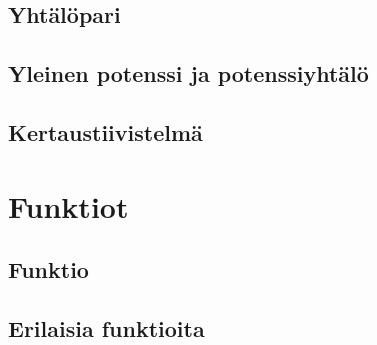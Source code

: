 \chapter{Yhtälöpari}


\chapter{Yleinen potenssi ja potenssiyhtälö}
\chapter{Kertaustiivistelmä}

\part{Funktiot}
\chapter{Funktio}
\chapter{Erilaisia funktioita}